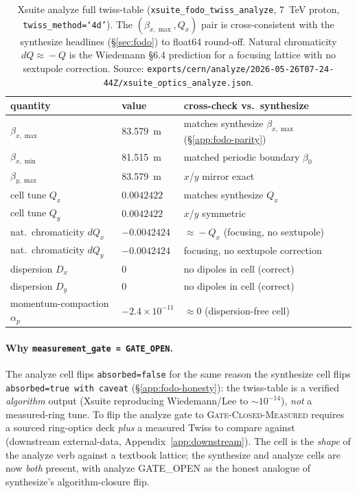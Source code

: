 \begin{table}[h]
\centering
\small
\setlength{\tabcolsep}{6pt}
\begin{tabular}{@{}l l l@{}}
\toprule
quantity & value & cross-check vs.\ synthesize \\
\midrule
$\beta_{x,\max}$        & \SI{83.579}{m}                & matches synthesize $\beta_{x,\max}$ (\S\ref{app:fodo-parity}) \\
$\beta_{x,\min}$        & \SI{81.515}{m}                & matched periodic boundary $\beta_0$ \\
$\beta_{y,\max}$        & \SI{83.579}{m}                & $x$/$y$ mirror exact \\
cell tune $Q_x$         & $0.0042422$                   & matches synthesize $Q_x$ \\
cell tune $Q_y$         & $0.0042422$                   & $x$/$y$ symmetric \\
nat.\ chromaticity $dQ_x$ & $-0.0042424$                & $\approx\!-Q_x$ (focusing, no sextupole) \\
nat.\ chromaticity $dQ_y$ & $-0.0042424$                & focusing, no sextupole correction \\
dispersion $D_x$        & 0                             & no dipoles in cell (correct) \\
dispersion $D_y$        & 0                             & no dipoles in cell (correct) \\
momentum-compaction $\alpha_p$ & $-2.4\times 10^{-11}$  & $\approx 0$ (dispersion-free cell) \\
\bottomrule
\end{tabular}
\caption{Xsuite analyze full twiss-table (\texttt{xsuite\_fodo\_twiss\_analyze},
\SI{7}{TeV} proton, \texttt{twiss\_method=`4d'}). The
$(\beta_{x,\max}, Q_x)$ pair is cross-consistent with the synthesize
headlines (\S\ref{sec:fodo}) to float64 round-off. Natural chromaticity
$dQ\!\approx\!-Q$ is the Wiedemann \S6.4 prediction for a focusing
lattice with no sextupole correction. Source:
\texttt{exports/cern/analyze/2026-05-26T07-24-44Z/xsuite\_optics\_analyze.json}.}
\label{tab:app-fodo-analyze}
\end{table}

\paragraph{Why \texttt{measurement\_gate = GATE\_OPEN}.} The analyze cell
flips \texttt{absorbed=false} for the same reason the synthesize cell
flips \texttt{absorbed=true with caveat} (\S\ref{app:fodo-honesty}): the
twiss-table is a verified \emph{algorithm} output (Xsuite reproducing
Wiedemann/Lee to $\sim\!10^{-14}$), \emph{not} a measured-ring tune. To
flip the analyze gate to \textsc{Gate-Closed-Measured} requires a
sourced ring-optics deck \emph{plus} a measured Twiss to compare against
(downstream external-data, Appendix~\ref{app:downstream}). The cell is
the \emph{shape} of the analyze verb against a textbook lattice; the
synthesize and analyze cells are now \emph{both} present, with
analyze GATE\_OPEN as the honest analogue of synthesize's
algorithm-closure flip.

